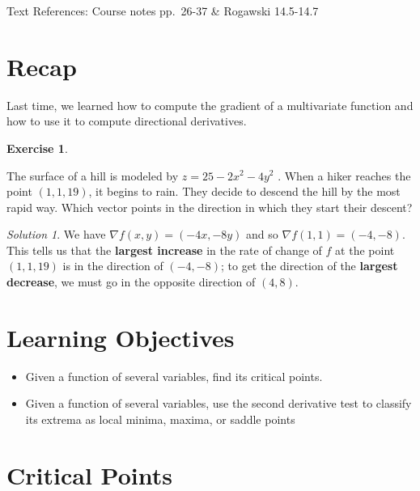 \documentclass[
]{book}
\providecommand{\tightlist}{%
  \setlength{\itemsep}{0pt}\setlength{\parskip}{0pt}}
\theoremstyle{definition}
\theoremstyle{definition}
\theoremstyle{definition}
\newtheorem{exercise}{Exercise}[chapter]
\theoremstyle{definition}
\theoremstyle{remark}
\newtheorem*{solution}{Solution}
\begin{document}
Text References: Course notes pp.~26-37 \& Rogawski 14.5-14.7

\hypertarget{recap-6}{%
\section{Recap}\label{recap-6}}

Last time, we learned how to compute the gradient of a multivariate function and how to use it to compute directional derivatives.

\begin{exercise}
\protect\hypertarget{exr:unlabeled-div-53}{}\label{exr:unlabeled-div-53}

The surface of a hill is modeled by \(z = 25 - 2x^2 - 4y^2\) . When a hiker reaches the point \((1, 1, 19)\), it begins to rain. They decide to descend the hill by the most rapid way. Which vector points in the direction in which they start their descent?

\end{exercise}

\begin{solution}

We have \(\nabla f (x,y)= \left (-4x, -8y\right)\) and so \(\nabla f (1,1)= (-4, -8)\). This tells us that the \textbf{largest increase} in the rate of change of \(f\) at the point \((1,1,19)\) is in the direction of \((-4,-8)\); to get the direction of the \textbf{largest decrease}, we must go in the opposite direction of \((4,8)\).

\end{solution}

\hypertarget{learning-objectives-7}{%
\section{Learning Objectives}\label{learning-objectives-7}}

\begin{itemize}
\tightlist
\item
  Given a function of several variables, find its critical points.
\item
  Given a function of several variables, use the second derivative test to classify its extrema as local minima, maxima, or saddle points
\end{itemize}

\hypertarget{critical-points}{%
\section{Critical Points}\label{critical-points}}
\end{document}

